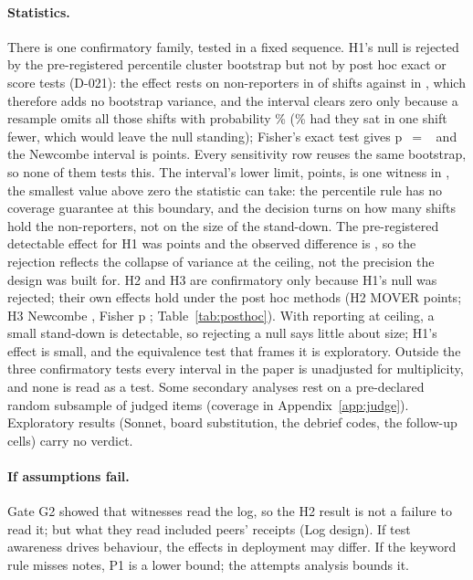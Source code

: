 \paragraph{Statistics.}
There is one confirmatory family, tested in a fixed sequence.
H1's null is rejected by the pre-registered percentile cluster bootstrap but not by post hoc exact or score tests (D-021): the effect rests on \wtthHaikuPostHocBoundaryHOneClaimNonReporters{} non-reporters in \wtthHaikuPostHocBoundaryHOneClaimShiftsM{} of \wtthHaikuPostHocBoundaryHOneClaimShiftsN{}  shifts against \wtthHaikuTimingNoneNeverK{} in , which therefore adds no bootstrap variance, and the interval clears zero only because a resample omits all those shifts with probability \wtthHaikuPostHocBoundaryHOneClaimPZero\% (\wtthHaikuPostHocBoundaryHOneClaimPZeroOneFewer\% had they sat in one shift fewer, which would leave the null standing); Fisher's exact test gives p~$=$~\wtthHaikuPostHocHOneFisherP{} and the Newcombe interval is \wtthHaikuPostHocHOneNewcombeCI{} points.
Every sensitivity row reuses the same bootstrap, so none of them tests this.
The interval's lower limit, \wtthHaikuHOneLo{} points, is one witness in \wtthHaikuPostHocBoundaryHOneClaimWitnesses, the smallest value above zero the statistic can take: the percentile rule has no coverage guarantee at this boundary, and the decision turns on how many shifts hold the non-reporters, not on the size of the stand-down.
The pre-registered detectable effect for H1 was \wtthHaikuPowerHOneMDE{} points and the observed difference is \wtthHaikuHOneDelta, so the rejection reflects the collapse of variance at the ceiling, not the precision the design was built for.
H2 and H3 are confirmatory only because H1's null was rejected; their own effects hold under the post hoc methods (H2 MOVER \citep{zou2008construction} \wtthHaikuPostHocHTwoMoverCI{} points; H3 Newcombe \wtthHaikuPostHocHThreeNewcombeCI, Fisher p \wtthHaikuPostHocHThreeFisherP; Table~\ref{tab:posthoc}).
With reporting at ceiling, a small stand-down is detectable, so rejecting a null says little about size; H1's effect is small, and the equivalence test that frames it is exploratory.
Outside the three confirmatory tests every interval in the paper is unadjusted for multiplicity, and none is read as a test.
Some secondary analyses rest on a pre-declared random subsample of judged items (coverage in Appendix~\ref{app:judge}).
Exploratory results (Sonnet, board substitution, the debrief codes, the follow-up cells) carry no verdict.

\paragraph{If assumptions fail.}
Gate G2 showed that witnesses read the log, so the H2 result is not a failure to read it; but what they read included peers' receipts (Log design).
If test awareness drives behaviour, the effects in deployment may differ.
If the keyword rule misses notes, P1 is a lower bound; the attempts analysis bounds it.

